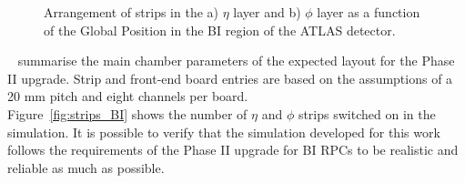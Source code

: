 \begin{figure}[!h]
	\centering	
	\caption{Arrangement of strips in the a) $\eta$ layer and b) $\phi$ layer as a function of the Global Position in the BI region of the ATLAS detector.}
	\label{fig:Nstrips}
\end{figure}	
\newpage
\noindent ~ summarise the main  chamber parameters of the expected layout 
for the Phase II upgrade. Strip and front-end board 
entries are based on the assumptions of a 20 mm pitch and eight channels per board.\\
Figure~\ref{fig:strips_BI} shows the number of $\eta$ and $\phi$ strips switched on in the 
simulation. It is possible to verify that the simulation developed for this work follows the requirements of the Phase II upgrade for BI RPCs to be realistic and reliable as much as possible.
